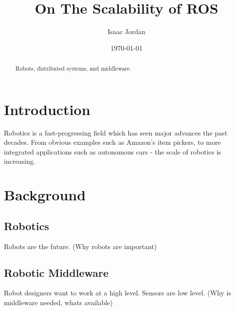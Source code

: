 \documentclass{l4proj}
\begin{document}
\title{On The Scalability of ROS}
\author{Isaac Jordan}
\date{\today}
\maketitle

\begin{abstract}
Robots, distributed systems, and middleware.
\end{abstract}

\educationalconsent
%
%
\tableofcontents

\chapter{Introduction}

Robotics is a fast-progressing field which has seen major advances the past decades. From obvious examples such as Amazon's item pickers, to more integrated applications such as autonomous cars - the scale of robotics is increasing.




\chapter{Background}

\section{Robotics}

Robots are the future. (Why robots are important)

\section{Robotic Middleware}

Robot designers want to work at a high level. Sensors are low level. (Why is middleware needed, whats available)
\end{document}
